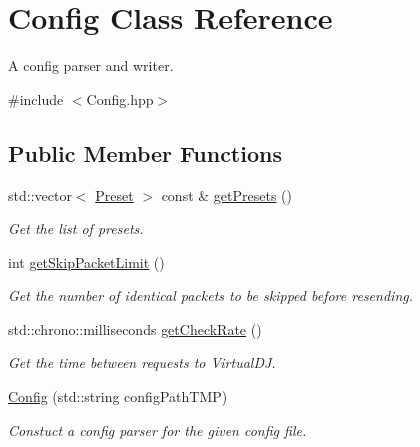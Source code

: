 \hypertarget{classConfig}{}\section{Config Class Reference}
\label{classConfig}


A config parser and writer.  




{\ttfamily \#include $<$Config.\+hpp$>$}

\subsection*{Public Member Functions}
\begin{DoxyCompactItemize}
\item 
\mbox{\label{classConfig_aff4607e897113173420e19882796d866}} 
std\+::vector$<$ \hyperlink{structPreset}{Preset} $>$ const  \& \hyperlink{classConfig_aff4607e897113173420e19882796d866}{get\+Presets} ()
\begin{DoxyCompactList}\small\item\em Get the list of presets. \end{DoxyCompactList}\item 
\mbox{\label{classConfig_a8cbdb452e8ebd40185783fde637851e4}} 
int \hyperlink{classConfig_a8cbdb452e8ebd40185783fde637851e4}{get\+Skip\+Packet\+Limit} ()
\begin{DoxyCompactList}\small\item\em Get the number of identical packets to be skipped before resending. \end{DoxyCompactList}\item 
\mbox{\label{classConfig_ac485e8b97e04fd82ca33c89416fbcce0}} 
std\+::chrono\+::milliseconds \hyperlink{classConfig_ac485e8b97e04fd82ca33c89416fbcce0}{get\+Check\+Rate} ()
\begin{DoxyCompactList}\small\item\em Get the time between requests to Virtual\+DJ. \end{DoxyCompactList}\item 
\mbox{\label{classConfig_a12421ddabec031b3d724d377fc920c8d}} 
\hyperlink{classConfig_a12421ddabec031b3d724d377fc920c8d}{Config} (std\+::string config\+Path\+T\+MP)
\begin{DoxyCompactList}\small\item\em Constuct a config parser for the given config file. \end{DoxyCompactList}\item 

\end{DoxyCompactItemize}
